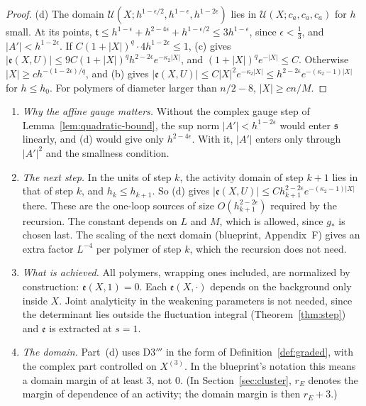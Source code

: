 \begin{proof}
(d) The domain $\mathcal U(X;h^{1-\epsilon/2},h^{1-\epsilon},h^{1-2\epsilon})$ lies in $\mathcal U(X;c_a,c_a,c_a)$ for $h$ small. At its points, $\mathfrak t\le h^{1-\epsilon}+h^{2-4\epsilon}+h^{1-\epsilon/2}\le3h^{1-\epsilon}$, since $\epsilon<\frac13$, and $|A'|<h^{1-2\epsilon}$. If $C(1+|X|)^q\cdot4h^{1-2\epsilon}\le1$, (c) gives $|\mathfrak e(X,U)|\le9C(1+|X|)^qh^{2-2\epsilon}e^{-\kappa_2|X|}$, and $(1+|X|)^qe^{-|X|}\le C$. Otherwise $|X|\ge ch^{-(1-2\epsilon)/q}$, and (b) gives $|\mathfrak e(X,U)|\le C|X|^2e^{-\kappa_2|X|}\le h^{2-2\epsilon}e^{-(\kappa_2-1)|X|}$ for $h\le h_0$. For polymers of diameter larger than $n/2-8$, $|X|\ge cn/M$.
\end{proof}

\begin{remark}\label{rem:one-loop-polymer}
\begin{enumerate}[label=(\alph*)]
\item \emph{Why the affine gauge matters.} Without the complex gauge step of Lemma~\ref{lem:quadratic-bound}, the sup norm $|A'|<h^{1-2\epsilon}$ would enter $\mathfrak s$ linearly, and (d) would give only $h^{2-4\epsilon}$. With it, $|A'|$ enters only through $|A'|^2$ and the smallness condition.
\item \emph{The next step.} In the units of step $k$, the activity domain of step $k+1$ lies in that of step $k$, and $h_k\le h_{k+1}$. So (d) gives $|\mathfrak e(X,U)|\le Ch_{k+1}^{2-2\epsilon}e^{-(\kappa_2-1)|X|}$ there. These are the one-loop sources of size $O(h_{k+1}^{2-2\epsilon})$ required by the recursion. The constant depends on $L$ and $M$, which is allowed, since $g_*$ is chosen last. The scaling of the next domain (blueprint, Appendix~F) gives an extra factor $L^{-4}$ per polymer of step $k$, which the recursion does not need.
\item \emph{What is achieved.} All polymers, wrapping ones included, are normalized by construction: $\mathfrak e(X,1)=0$. Each $\mathfrak e(X,\cdot)$ depends on the background only inside $X$. Joint analyticity in the weakening parameters is not needed, since the determinant lies outside the fluctuation integral (Theorem~\ref{thm:step}) and $\mathfrak e$ is extracted at $s=1$.
\item \emph{The domain.} Part~(d) uses D3$'''$ in the form of Definition~\ref{def:graded}, with the complex part controlled on $X^{(3)}$. In the blueprint's notation this means a domain margin of at least $3$, not $0$. (In Section~\ref{sec:cluster}, $r_E$ denotes the margin of dependence of an activity; the domain margin is then $r_E+3$.)

\end{enumerate}
\end{remark}

